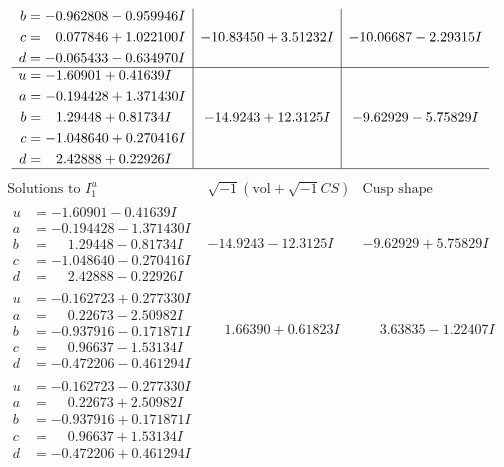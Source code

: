 \documentclass[1p]{elsarticle_modified}
\theoremstyle{definition}
\newcommand{\I}{\sqrt{-1}}
\begin{document}
$$\begin{array}{c|c|c}
\begin{aligned}
b &= -0.962808 - 0.959946 I \\
c &= \phantom{-}0.077846 + 1.022100 I \\
d &= -0.065433 - 0.634970 I\end{aligned}
 & -10.83450 + 3.51232 I & -10.06687 - 2.29315 I \\ \hline\begin{aligned}
u &= -1.60901 + 0.41639 I \\
a &= -0.194428 + 1.371430 I \\
b &= \phantom{-}1.29448 + 0.81734 I \\
c &= -1.048640 + 0.270416 I \\
d &= \phantom{-}2.42888 + 0.22926 I\end{aligned}
 & -14.9243 + 12.3125 I & -9.62929 - 5.75829 I\\
 \hline 
 \end{array}$$\newpage$$\begin{array}{c|c|c}  
\text{Solutions to }I^u_{1}& \I (\text{vol} + \sqrt{-1}CS) & \text{Cusp shape}\\
 \hline 
\begin{aligned}
u &= -1.60901 - 0.41639 I \\
a &= -0.194428 - 1.371430 I \\
b &= \phantom{-}1.29448 - 0.81734 I \\
c &= -1.048640 - 0.270416 I \\
d &= \phantom{-}2.42888 - 0.22926 I\end{aligned}
 & -14.9243 - 12.3125 I & -9.62929 + 5.75829 I \\ \hline\begin{aligned}
u &= -0.162723 + 0.277330 I \\
a &= \phantom{-}0.22673 - 2.50982 I \\
b &= -0.937916 - 0.171871 I \\
c &= \phantom{-}0.96637 - 1.53134 I \\
d &= -0.472206 - 0.461294 I\end{aligned}
 & \phantom{-}1.66390 + 0.61823 I & \phantom{-}3.63835 - 1.22407 I \\ \hline\begin{aligned}
u &= -0.162723 - 0.277330 I \\
a &= \phantom{-}0.22673 + 2.50982 I \\
b &= -0.937916 + 0.171871 I \\
c &= \phantom{-}0.96637 + 1.53134 I \\
d &= -0.472206 + 0.461294 I\end{aligned}

\end{array}$$
\end{document}
